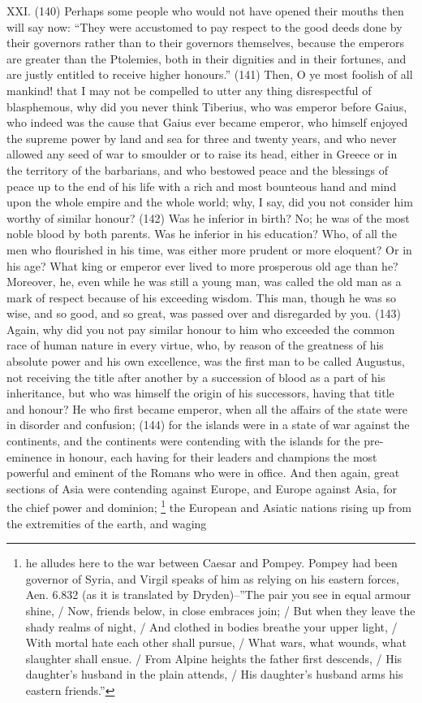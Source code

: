 XXI. (140) Perhaps some people who would not have opened their mouths then will say now: ``They
were accustomed to pay respect to the good deeds done by their governors rather than to their
governors themselves, because the emperors are greater than the Ptolemies, both in their
dignities and in their fortunes, and are justly entitled to receive higher honours.'' (141) Then, O ye
most foolish of all mankind! that I may not be compelled to utter any thing disrespectful of
blasphemous, why did you never think Tiberius, who was emperor before Gaius, who indeed was
the cause that Gaius ever became emperor, who himself enjoyed the supreme power by land and
sea for three and twenty years, and who never allowed any seed of war to smoulder or to raise its
head, either in Greece or in the territory of the barbarians, and who bestowed peace and the
blessings of peace up to the end of his life with a rich and most bounteous hand and mind upon the
whole empire and the whole world; why, I say, did you not consider him worthy of similar honour?
(142) Was he inferior in birth? No; he was of the most noble blood by both parents. Was he
inferior in his education? Who, of all the men who flourished in his time, was either more prudent or
more eloquent? Or in his age? What king or emperor ever lived to more prosperous old age than
he? Moreover, he, even while he was still a young man, was called the old man as a mark of
respect because of his exceeding wisdom. This man, though he was so wise, and so good, and so
great, was passed over and disregarded by you. (143) Again, why did you not pay similar honour to
him who exceeded the common race of human nature in every virtue, who, by reason of the
greatness of his absolute power and his own excellence, was the first man to be called Augustus,
not receiving the title after another by a succession of blood as a part of his inheritance, but who
was himself the origin of his successors, having that title and honour? He who first became
emperor, when all the affairs of the state were in disorder and confusion; (144) for the islands
were in a state of war against the continents, and the continents were contending with the islands
for the pre-eminence in honour, each having for their leaders and champions the most powerful
and eminent of the Romans who were in office. And then again, great sections of Asia were
contending against Europe, and Europe against Asia, for the chief power and dominion; \footnote{he alludes
here to the war between Caesar and Pompey. Pompey had been governor of Syria, and Virgil speaks of him as relying on
his eastern forces, Aen. 6.832 (as it is translated by Dryden)--''The pair you see in equal armour shine, / Now, friends
below, in close embraces join; / But when they leave the shady realms of night, / And clothed in bodies breathe your upper
light, / With mortal hate each other shall pursue, / What wars, what wounds, what slaughter shall ensue. / From Alpine
heights the father first descends, / His daughter's husband in the plain attends, / His daughter's husband arms his eastern
friends.''} the European and Asiatic nations rising up from the extremities of the earth, and waging
